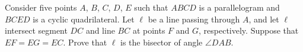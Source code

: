 Consider five points $A$, $B$, $C$, $D$, $E$ such that $ABCD$ is a parallelogram and $BCED$ is a cyclic quadrilateral. Let $\ell$ be a line passing through $A$, and let $\ell$ intersect segment $DC$ and line $BC$ at points $F$ and $G$, respectively. Suppose that $EF = EG = EC$. Prove that $\ell$ is the bisector of angle $\angle DAB$.
